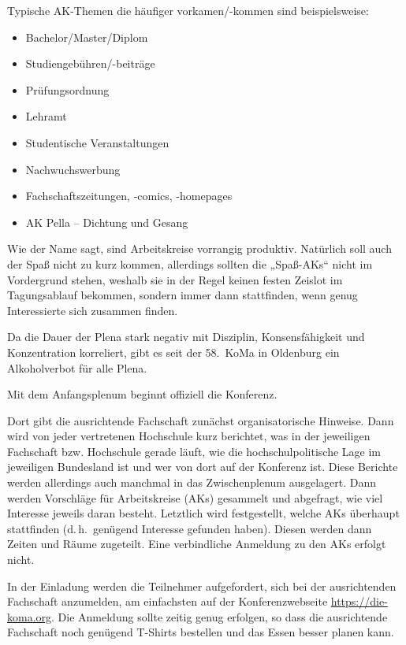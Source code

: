 \begin{description}
	Typische AK-Themen die häufiger vorkamen/-kommen sind beispielsweise:
	\begin{itemize}
		\item Bachelor/Master/Diplom
		\item Studiengebühren/-beiträge
		\item Prüfungsordnung
		\item Lehramt
		\item Studentische Veranstaltungen
		\item Nachwuchswerbung
		\item Fachschaftszeitungen, -comics, -homepages
		\item AK Pella -- Dichtung und Gesang
	\end{itemize}
	Wie der Name sagt, sind Arbeitskreise vorrangig produktiv. Natürlich soll auch der Spaß nicht zu kurz kommen, allerdings sollten die „Spaß-AKs“ nicht im Vordergrund stehen, weshalb sie in der Regel keinen festen Zeislot im Tagungsablauf bekommen, sondern immer dann stattfinden, wenn genug Interessierte sich zusammen finden.

\item[Alkoholverbot im Plenum]
    Da die Dauer der Plena stark negativ mit Disziplin, Konsensfähigkeit und Konzentration korreliert, gibt es seit der 58.~KoMa in Oldenburg ein Alkoholverbot für alle Plena.

\item[Anfangsplenum]
    Mit dem Anfangsplenum beginnt offiziell die Konferenz.

    Dort gibt die ausrichtende Fachschaft zunächst organisatorische Hinweise. Dann wird von jeder vertretenen Hochschule kurz berichtet, was in der jeweiligen Fachschaft bzw. Hochschule gerade läuft, wie die hochschulpolitische Lage im jeweiligen Bundesland ist und wer von dort auf der Konferenz ist. Diese Berichte werden allerdings auch manchmal in das Zwischenplenum ausgelagert. Dann werden Vorschläge für Arbeitskreise (AKs) gesammelt und abgefragt, wie viel Interesse jeweils daran besteht. Letztlich wird festgestellt, welche AKs überhaupt stattfinden (d.\,h.\ genügend Interesse gefunden haben). Diesen werden dann Zeiten und Räume zugeteilt. Eine verbindliche Anmeldung zu den AKs erfolgt nicht.

\item[Anmeldung]
    In der Einladung werden die Teilnehmer aufgefordert, sich bei der ausrichtenden Fachschaft anzumelden, am einfachsten auf der Konferenzwebseite \url{https://die-koma.org}. Die Anmeldung sollte zeitig genug erfolgen, so dass die ausrichtende Fachschaft noch genügend T-Shirts bestellen und das Essen besser planen kann.


\end{description}
